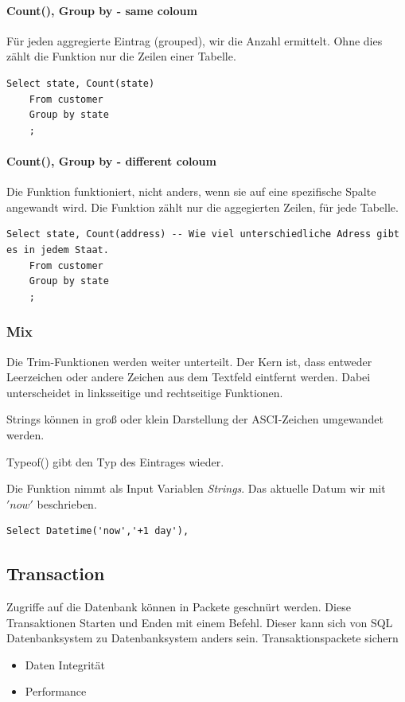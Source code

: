 \paragraph{Count(), Group by - same coloum}
Für jeden aggregierte Eintrag (grouped), wir die Anzahl ermittelt. Ohne dies zählt die  Funktion nur die Zeilen einer Tabelle.
	\begin{lstlisting}[style=SQL]
	Select state, Count(state)
	From customer
	Group by state
	;
\end{lstlisting}

\paragraph{Count(), Group by - different coloum}
Die  Funktion funktioniert, nicht anders, wenn sie auf eine spezifische Spalte angewandt wird. Die Funktion zählt nur die aggegierten Zeilen, für jede Tabelle.
	\begin{lstlisting}[style=SQL]
	Select state, Count(address) -- Wie viel unterschiedliche Adress gibt es in jedem Staat.
	From customer
	Group by state
	;
\end{lstlisting}

\subsubsection{Mix}
\begin{description}
	\item[Trim] Die Trim-Funktionen werden weiter unterteilt. Der Kern ist, dass entweder Leerzeichen oder andere Zeichen aus dem Textfeld eintfernt werden. Dabei unterscheidet  in linksseitige  und rechtseitige  Funktionen.
	\item[Case Function] Strings können in groß oder klein Darstellung der ASCI-Zeichen umgewandet werden. 
	\item Typeof() gibt den Typ des Eintrages wieder.
	\item[Datetime] Die  Funktion nimmt als Input Variablen \textit{Strings}. Das aktuelle Datum wir mit $'now'$ beschrieben.
	\begin{lstlisting}[style=SQL]
		Select Datetime('now','+1 day'),
	\end{lstlisting}
\end{description}

\subsection{Transaction}
Zugriffe auf die Datenbank können in Packete geschnürt werden. Diese Transaktionen Starten und Enden mit einem Befehl. Dieser kann sich von SQL Datenbanksystem zu Datenbanksystem anders sein. 
Transaktionspackete sichern
\begin{itemize}
	\item Daten Integrität
	\item Performance
\end{itemize}


